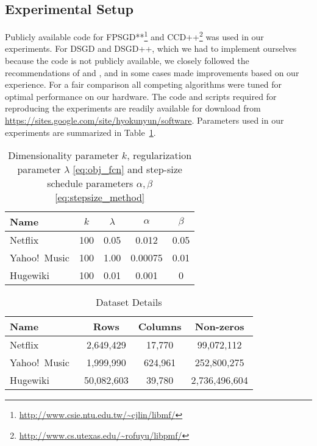 \documentclass{vldb}
\begin{document}
\subsection{Experimental Setup}
\label{sec:ExperimentalSetup}

Publicly available code for
FPSGD**\footnote{\url{http://www.csie.ntu.edu.tw/~cjlin/libmf/}} and
CCD++\footnote{\url{http://www.cs.utexas.edu/~rofuyu/libpmf/}} was used
in our experiments.  For DSGD and DSGD++, which we had to implement
ourselves because the code is not publicly available, we closely
followed the recommendations of \citet{GemNijHaaSis11} and
\citet{TefMakGem12}, and in some cases made improvements based on our
experience.  For a fair comparison all competing algorithms were tuned
for optimal performance on our hardware.  The code and scripts required
for reproducing the experiments are readily available for download from
\url{https://sites.google.com/site/hyokunyun/software}. Parameters used
in our experiments are summarized in Table~\ref{tab:parameters}.

\begin{table}[htbp]
  \centering
  \caption{Dimensionality parameter $k$, regularization parameter
    $\lambda$ \eqref{eq:obj_fcn} and step-size schedule
    parameters $\alpha, \beta$ \eqref{eq:stepsize_method}}
  \begin{tabular}[htbp]{|l|c|c|c|c|}
    \hline 
    Name & $k$ & $\lambda$ & $\alpha$ & $\beta$\\
    \hline
    Netflix & 100 & 0.05 & 0.012 & 0.05 \\
    \hline
    Yahoo!\ Music & 100 & 1.00 & 0.00075 & 0.01 \\
    \hline
    Hugewiki & 100 & 0.01 & 0.001 & 0 \\
    \hline
  \end{tabular}
  \label{tab:parameters}
\end{table}

\begin{table}[htbp]
  \centering
  \caption{Dataset Details}
  \begin{tabular}[htbp]{|l|c|c|c|}
    \hline
    Name & Rows & Columns & Non-zeros \\
    \hline
    Netflix~\citep{BelKor07} & 2,649,429 & 17,770 & 99,072,112  \\
    \hline
    Yahoo!\ Music~\citep{DroKoeKorWei11} & 1,999,990 & 624,961 & 252,800,275  \\
    \hline
    Hugewiki~\citep{GraphLabDatasets} & 50,082,603 & 39,780 & 2,736,496,604 \\
    \hline
  \end{tabular}
  \label{tab:data}
\end{table}
\end{document}
